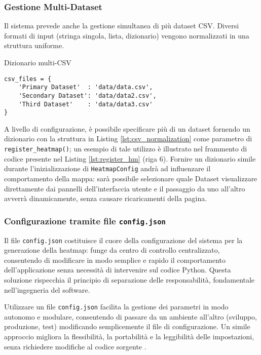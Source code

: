 \subsubsection{Gestione Multi-Dataset}
Il sistema prevede anche la gestione simultanea di più dataset CSV. Diversi formati di input (stringa singola, lista, dizionario) vengono normalizzati in una struttura uniforme.

\begin{listing}[H]
\caption{Dizionario multi-CSV} %
\label{lst:csv_normalization} %
\begin{verbatim}
csv_files = {
    'Primary Dataset'  : 'data/data.csv',
    'Secondary Dataset': 'data/data2.csv',
    'Third Dataset'    : 'data/data3.csv'
}
\end{verbatim}
\end{listing}

A livello di configurazione, è possibile specificare più di un dataset fornendo un dizionario con la struttura in Listing \ref{lst:csv_normalization} come parametro di \texttt{register\_heatmap()}; un esempio di tale utilizzo è illustrato nel frammento di codice presente nel Listing \ref{lst:register_hm} (riga 6).
Fornire un dizionario simile durante l'inizializzazione di \texttt{HeatmapConfig} andrà ad influenzare il comportamento della mappa: sarà possibile selezionare quale Dataset visualizzare direttamente dai pannelli dell'interfaccia utente e il passaggio da uno all'altro avverrà dinamicamente, senza causare ricaricamenti della pagina.

\subsubsection{Configurazione tramite file \texttt{config.json}}

Il file \texttt{config.json} costituisce il cuore della configurazione del sistema per la generazione della heatmap: funge da centro di controllo centralizzato, consentendo di modificare in modo semplice e rapido il comportamento dell'applicazione senza necessità di intervenire sul codice Python. Questa soluzione rispecchia il principio di separazione delle responsabilità, fondamentale nell'ingegneria del software.

Utilizzare un file \texttt{config.json} facilita la gestione dei parametri in modo autonomo e modulare, consentendo di passare da un ambiente all'altro (sviluppo, produzione, test) modificando semplicemente il file di configurazione. Un simile approccio migliora la flessibilità, la portabilità e la leggibilità delle impostazioni, senza richiedere modifiche al codice sorgente \cite{understanding-config-json,config-files-types}.

